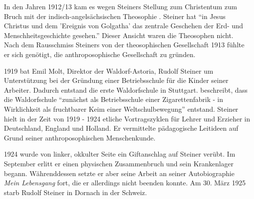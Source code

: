 
In den Jahren 1912/13 kam es wegen Steiners Stellung zum Christentum zum Bruch mit der indisch-angelsächsischen Theosophie \citep[Vgl.][S. 80]{hemleben63}. Steiner hat \enquote{in Jesus Christus und dem 'Ereignis von Golgatha' das zentrale Geschehen der Erd- und Menschheitsgeschichte gesehen.}  Dieser Ansicht waren die Theosophen nicht. Nach dem Rausschmiss Steiners von der theosophischen Gesellschaft 1913 fühlte er sich genötigt, die anthroposophische Gesellschaft zu gründen.

1919 bat Emil Molt, Direktor der Waldorf-Astoria, Rudolf Steiner um Unterstützung bei der Gründung einer Betriebsschule für die Kinder seiner Arbeiter. Dadurch entstand die erste Waldorfschule in Stuttgart. \citet[S. 124]{hemleben63} beschreibt, dass die Waldorfschule \enquote{zunächst als Betriebsschule einer Zigarettenfabrik - in Wirklichkeit als fruchtbarer Keim einer Weltschulbewegung} entstand. Steiner hielt in der Zeit von 1919 - 1924 etliche Vortragszyklen für Lehrer und Erzieher in Deutschland, England und Holland. Er vermittelte pädagogische Leitideen auf Grund seiner anthroposophischen Menschenkunde. 

1924 wurde von linker, okkulter Seite ein Giftanschlag auf Steiner verübt. Im September erlitt er einen physischen Zusammenbruch und sein Krankenlager begann. Währenddessen setzte er aber seine Arbeit an seiner Autobiographie \emph{Mein Lebensgang} fort, die er allerdings nicht beenden konnte. Am 30. März 1925 starb Rudolf Steiner in Dornach in der Schweiz. \citep[Vgl.][]{karl12}



















